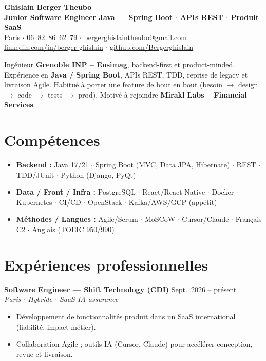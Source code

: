 \documentclass[10pt,a4paper]{article}
\begin{document}
\begin{center}
  {\LARGE\bfseries\color{mirakl} Ghislain Berger Theubo}\\[2pt]
  {\large\bfseries Junior Software Engineer Java --- Spring Boot $\cdot$ APIs REST $\cdot$ Produit SaaS}\\[3pt]
  Paris $\cdot$ \href{tel:+33682866279}{06~82~86~62~79} $\cdot$
  \href{mailto:bergerghislaintheubo@gmail.com}{bergerghislaintheubo@gmail.com}\\
  \href{https://linkedin.com/in/berger-ghislain}{linkedin.com/in/berger-ghislain} $\cdot$
  \href{https://github.com/Bergerghislain}{github.com/Bergerghislain}
\end{center}
\vspace{3pt}
Ingénieur \textbf{Grenoble INP -- Ensimag}, backend-first et product-minded.
Expérience en \textbf{Java / Spring Boot}, APIs REST, TDD, reprise de legacy et livraison Agile.
Habitué à porter une feature de bout en bout (besoin $\rightarrow$ design $\rightarrow$ code $\rightarrow$ tests $\rightarrow$ prod).
Motivé à rejoindre \textbf{Mirakl Labs -- Financial Services}.

\section*{Compétences}
\begin{itemize}
  \item \textbf{Backend :} Java 17/21 $\cdot$ Spring Boot (MVC, Data JPA, Hibernate) $\cdot$ REST $\cdot$ TDD/JUnit $\cdot$ Python (Django, PyQt)
  \item \textbf{Data / Front / Infra :} PostgreSQL $\cdot$ React/React Native $\cdot$ Docker $\cdot$ Kubernetes $\cdot$ CI/CD $\cdot$ OpenStack $\cdot$ Kafka/AWS/GCP (appétit)
  \item \textbf{Méthodes / Langues :} Agile/Scrum $\cdot$ MoSCoW $\cdot$ Cursor/Claude $\cdot$ Français C2 $\cdot$ Anglais (TOEIC 950/990)
\end{itemize}

\section*{Expériences professionnelles}

\textbf{Software Engineer --- Shift Technology (CDI)} \hfill Sept.\ 2026 -- présent\\
{\small\textit{Paris $\cdot$ Hybride $\cdot$ SaaS IA assurance}}
\begin{itemize}
  \item Développement de fonctionnalités produit dans un SaaS international (fiabilité, impact métier).
  \item Collaboration Agile ; outils IA (Cursor, Claude) pour accélérer conception, revue et livraison.
\end{itemize}
\end{document}
